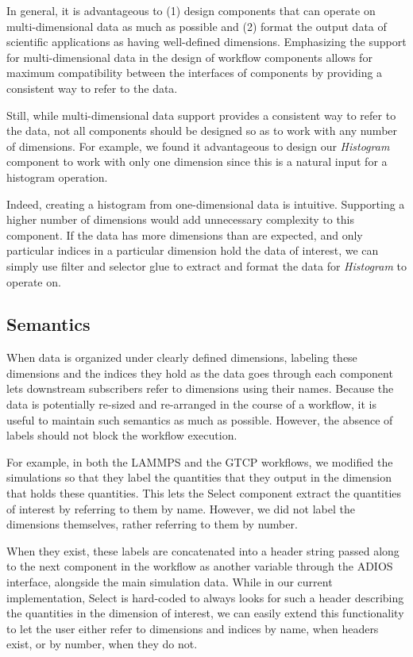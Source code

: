 In general, it is advantageous to (1) design
components that can operate on
multi-dimensional data as much as possible
and (2) format the output data of
scientific applications as having well-defined
dimensions. Emphasizing the support for multi-dimensional
data in the design of workflow components allows
for maximum compatibility between the interfaces
of components by providing a
consistent way to refer to the data.

Still, while multi-dimensional data support
provides a consistent way to refer
to the data, not all components should be
designed so as to work with
any number of dimensions.
For example, we found it advantageous to
design our {\em Histogram} component to work with
only one dimension since this is
a natural input for a histogram operation.

Indeed, creating a histogram from one-dimensional data is intuitive.
Supporting a higher number of dimensions
would add unnecessary complexity
to this component. If the data has more
dimensions than are expected,
and only particular indices in a particular
dimension hold the data of interest,
we can simply use filter and selector
glue to extract and format the data for
{\em Histogram} to operate on.
\fi

\subsection{Semantics}

When data is organized under clearly defined
dimensions, labeling these
dimensions and the indices they hold
as the data goes through each component
lets downstream subscribers
refer to dimensions using their names.
Because the data is potentially re-sized
and re-arranged in the course of a workflow,
it is useful to maintain such
semantics as much as possible. However,
the absence of labels should not block
the workflow execution.

For example, in both the LAMMPS and the GTCP workflows, we modified
the simulations so that they label the
quantities that they output in the
dimension that holds
these quantities. This lets the Select component
extract the quantities of interest by referring
to them by name. However, we did not label the dimensions
themselves, rather referring to them by number. 

When they exist, these labels are concatenated
into a header string passed along to the
next component in the workflow as another variable
through the ADIOS interface, alongside the main
simulation data.
While in our current implementation, Select is hard-coded to
always looks for such a header describing the quantities
in the dimension of interest, 
we can easily extend this functionality to let the user either refer
to dimensions and indices by name, when headers exist, or by number,
when they do not.

